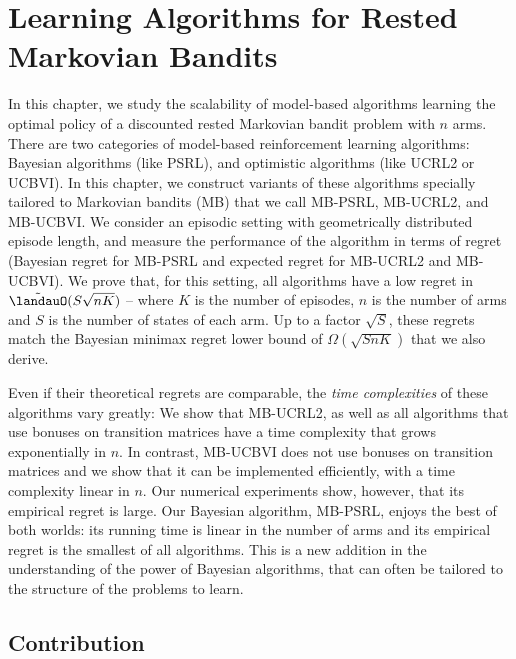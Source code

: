 \begingroup

\let\clearpage\relax

\chapter{Learning Algorithms for Rested Markovian Bandits}
\label{ch:learning_rested}

In this chapter, we study the scalability of model-based algorithms learning the optimal policy of a discounted rested Markovian bandit  problem with $n$ arms. There are two categories of model-based reinforcement learning algorithms: Bayesian algorithms (like PSRL), and optimistic algorithms (like UCRL2 or UCBVI). %
In this chapter, we construct variants of these algorithms specially tailored to Markovian bandits (MB) that we call MB-PSRL, MB-UCRL2, and MB-UCBVI. We consider an episodic setting with geometrically distributed episode length, and measure the performance of the algorithm in terms of regret (Bayesian regret for MB-PSRL and expected regret for MB-UCRL2 and MB-UCBVI). We prove that, for this setting, all algorithms have a low regret in $\tilde{\landauO}(S\sqrt{nK})$ -- where $K$ is the number of episodes, $n$ is the number of arms and $S$ is the number of states of each arm. Up to a factor $\sqrt{S}$, these regrets match the Bayesian minimax regret lower bound of $\Omega(\sqrt{SnK})$ that we also derive.

Even if their theoretical regrets are comparable, the \emph{time complexities} of these  algorithms vary greatly: We show that MB-UCRL2, as well as all  algorithms that use bonuses on transition matrices have a {time} complexity  that grows  exponentially in $n$. In contrast, MB-UCBVI does not use bonuses on transition matrices and we show that  it can be implemented efficiently, with a time complexity linear in $n$. Our numerical experiments show, however, that its empirical regret is large. Our Bayesian algorithm, MB-PSRL, enjoys the best of both worlds: its running time is linear in the number of arms and its empirical regret is the smallest of all algorithms.
This is a new addition in the understanding of the power of Bayesian algorithms, that can often be  tailored to the structure of the problems to learn.


\section{Contribution}
\label{ch:rested:sec:contribute}

